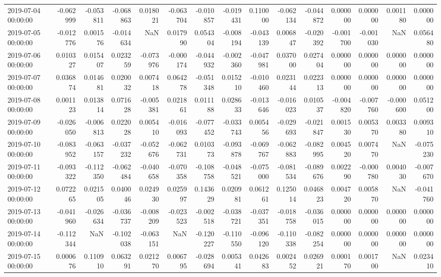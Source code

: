 \begin{tabular}{lrrrrrrrrrrrrrr}
2019-07-04 00:00:00 & -0.062999 & -0.053811 & -0.068863 & 0.018021 & -0.063704 & -0.010857 & -0.019431 & 0.110000 & -0.062134 & -0.044872 & 0.000000 & 0.000000 & 0.001180 & 0.000000 \\
2019-07-05 00:00:00 & -0.012776 & 0.001576 & -0.014634 & NaN & 0.017990 & 0.054304 & -0.008194 & -0.043139 & 0.006847 & -0.020392 & -0.001700 & -0.001030 & NaN & 0.056480 \\
2019-07-06 00:00:00 & 0.010327 & 0.015407 & 0.023259 & -0.073976 & -0.000174 & -0.044932 & -0.002360 & -0.047981 & 0.037000 & 0.027404 & 0.000000 & 0.000000 & 0.000000 & 0.000000 \\
2019-07-07 00:00:00 & 0.036874 & 0.014681 & 0.020032 & 0.007418 & 0.064278 & -0.051348 & 0.015210 & -0.010460 & 0.023144 & 0.022313 & 0.000000 & 0.000000 & 0.000000 & 0.000000 \\
2019-07-08 00:00:00 & 0.001123 & 0.013814 & 0.071628 & -0.005381 & 0.021861 & 0.011188 & 0.028633 & -0.013646 & -0.016023 & 0.010537 & -0.004820 & -0.007760 & -0.000600 & 0.051200 \\
2019-07-09 00:00:00 & -0.026050 & -0.006813 & 0.022028 & 0.005410 & -0.016093 & -0.077452 & -0.033743 & 0.005456 & -0.029693 & -0.021847 & 0.001530 & 0.005370 & 0.003380 & 0.009310 \\
2019-07-10 00:00:00 & -0.083952 & -0.063157 & -0.037232 & -0.052676 & -0.062731 & 0.010373 & -0.093878 & -0.069767 & -0.062883 & -0.082995 & 0.004520 & 0.007470 & NaN & -0.075230 \\
2019-07-11 00:00:00 & -0.093322 & -0.112350 & -0.062484 & -0.040658 & -0.070358 & -0.108758 & -0.048521 & -0.075000 & -0.081534 & -0.089676 & 0.002290 & -0.000780 & 0.004030 & -0.007670 \\
2019-07-12 00:00:00 & 0.072265 & 0.021505 & 0.040046 & 0.024930 & 0.025997 & 0.143629 & 0.020981 & 0.061261 & 0.125014 & 0.046823 & 0.004720 & 0.005870 & NaN & -0.041760 \\
2019-07-13 00:00:00 & -0.041960 & -0.026634 & -0.036737 & -0.008209 & -0.023523 & -0.002518 & -0.038721 & -0.037351 & -0.018758 & -0.036015 & 0.000000 & 0.000000 & 0.000000 & 0.000000 \\
2019-07-14 00:00:00 & -0.112344 & NaN & -0.102038 & -0.063151 & NaN & -0.120227 & -0.110550 & -0.096120 & -0.110338 & -0.082254 & 0.000000 & 0.000000 & 0.000000 & 0.000000 \\
2019-07-15 00:00:00 & 0.000676 & 0.110910 & 0.063291 & 0.021270 & 0.006795 & -0.028694 & 0.005341 & 0.042683 & 0.002452 & 0.026921 & 0.000170 & 0.001700 & NaN & 0.023410 \\

\end{tabular}
